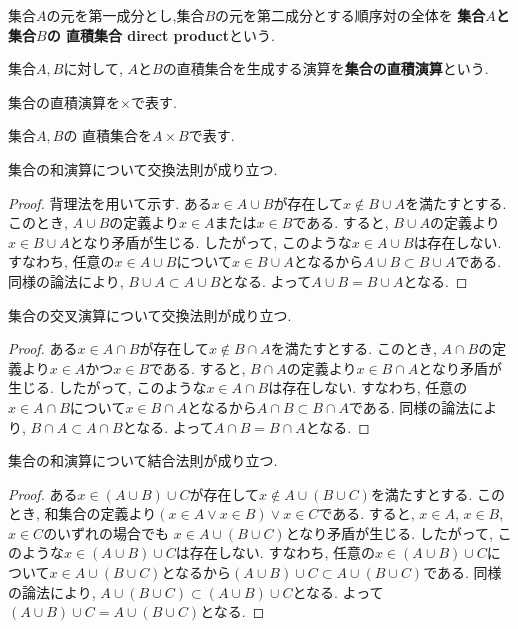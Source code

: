 \begin{Def}
集合$A$の元を第一成分とし,集合$B$の元を第二成分とする順序対の全体を
{\bf 集合$A$と集合$B$の
直積集合 direct product}という.
\end{Def}
\begin{Def}
集合$A,B$に対して, $A$と$B$の直積集合を生成する演算を{\bf 集合の直積演算}という.
\end{Def}
\begin{Notation}
集合の直積演算を$\times$で表す.
\end{Notation}
\begin{Notation}
集合$A,B$の
直積集合を$A\times B$で表す.
\end{Notation}
\begin{thm}
集合の和演算について交換法則が成り立つ.
\end{thm}
\begin{proof}
背理法を用いて示す.
ある$x\in A\cup B$が存在して$x\notin B\cup A$を満たすとする.
このとき, $A\cup B$の定義より$x\in A$または$x\in B$である.
すると, $B\cup A$の定義より$x\in B\cup A$となり矛盾が生じる. したがって, このような$x\in A\cup B$は存在しない. すなわち, 任意の$x\in A\cup B$について$x\in B\cup A$となるから$A\cup B\subset B\cup A$である. 
同様の論法により, $B\cup A\subset A\cup B$となる.
よって$A\cup B=B\cup A$となる.
\end{proof}
\begin{thm}
集合の交叉演算について交換法則が成り立つ.
\end{thm}
\begin{proof}
ある$x\in A\cap B$が存在して$x\notin B\cap A$を満たすとする.
このとき, $A\cap B$の定義より$x\in A$かつ$x\in B$である.
すると, $B\cap A$の定義より$x\in B\cap A$となり矛盾が生じる. したがって, このような$x\in A\cap B$は存在しない. すなわち, 任意の$x\in A\cap B$について$x\in B\cap A$となるから$A\cap B\subset B\cap A$である. 
同様の論法により, $B\cap A\subset A\cap B$となる.
よって$A\cap B=B\cap A$となる.
\end{proof}
\begin{thm}
集合の和演算について結合法則が成り立つ.
\end{thm}
\begin{proof}
ある$x\in (A\cup B)\cup C$が存在して$x\notin A\cup (B\cup C)$を満たすとする.
このとき, 和集合の定義より$(x\in A\lor x\in B)\lor x\in C$である.
すると, 
$x\in A$, $x\in B$, $x\in C$のいずれの場合でも
$x\in A\cup(B\cup C)$となり矛盾が生じる. したがって, このような$x\in (A\cup B)\cup C$は存在しない. すなわち, 任意の$x\in (A\cup B)\cup C$について$x\in A\cup (B\cup C)$となるから$(A\cup B)\cup C\subset A\cup (B\cup C)$である. 
同様の論法により, $A\cup (B\cup C)\subset (A\cup B)\cup C$となる.
よって$(A\cup B)\cup C=A\cup (B\cup C)$となる.
\end{proof}

